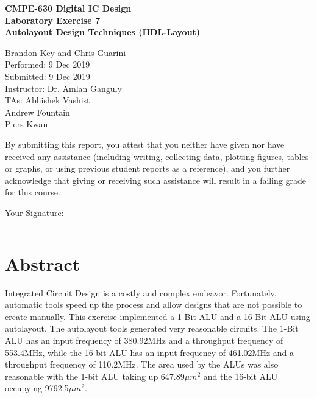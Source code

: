 \documentclass[11pt]{article}
\begin{document}
%
%

\vspace*{2 cm}

\begin{center}
\bf{CMPE-630 Digital IC Design\\
    Laboratory Exercise 7\\
\vspace{0.25 cm}
Autolayout Design Techniques (HDL-Layout)
}
\end{center}

\vspace{6 cm}

\begin{flushright}
Brandon Key and Chris Guarini\\
Performed: 9 Dec 2019\\
Submitted: 9 Dec 2019\\
\vspace{0.5 cm}
Instructor: Dr. Amlan Ganguly\\
TAs: Abhishek Vashist\\
Andrew Fountain\\
Piers Kwan\\
\vspace{0.5 cm}
\end{flushright}

\vspace{3 cm}
\indent By submitting this report, you attest that you neither have given nor have received any assistance (including writing, collecting data, plotting figures, tables or graphs, or using previous student reports as a reference), and you further acknowledge that giving or receiving such assistance will result in a failing grade for this course.

\vspace{1 cm}
Your Signature:   \rule{13cm}{.1pt}


\tableofcontents
\newpage

\section{Abstract}

	Integrated Circuit Design is a costly and complex endeavor. Fortunately, automatic tools speed up the process and allow designs that are not possible to create manually. This exercise implemented a 1-Bit ALU and a 16-Bit ALU using autolayout. The autolayout tools generated very reasonable circuits. The 1-Bit ALU has an input frequency of 380.92MHz and a throughput frequency of 553.4MHz, while the 16-bit ALU has an input frequency of 461.02MHz and a throughput frequency of 110.2MHz. The area used by the ALUs was also reasonable with the 1-bit ALU taking up 647.89$\mu m^2$ and the 16-bit ALU occupying 9792.5$\mu m^2$.
	
\end{document}
